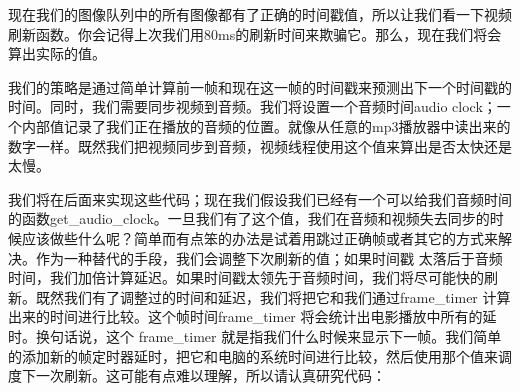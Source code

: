 现在我们的图像队列中的所有图像都有了正确的时间戳值，所以让我们看一下视频刷新函数。你会记得上次我们用80ms的刷新时间来欺骗它。那么，现在我们将会算出实际的值。

我们的策略是通过简单计算前一帧和现在这一帧的时间戳来预测出下一个时间戳的时间。同时，我们需要同步视频到音频。我们将设置一个音频时间audio clock；一个内部值记录了我们正在播放的音频的位置。就像从任意的mp3播放器中读出来的数字一样。既然我们把视频同步到音频，视频线程使用这个值来算出是否太快还是太慢。

我们将在后面来实现这些代码；现在我们假设我们已经有一个可以给我们音频时间的函数get_audio_clock。一旦我们有了这个值，我们在音频和视频失去同步的时候应该做些什么呢？简单而有点笨的办法是试着用跳过正确帧或者其它的方式来解决。作为一种替代的手段，我们会调整下次刷新的值；如果时间戳 太落后于音频时间，我们加倍计算延迟。如果时间戳太领先于音频时间，我们将尽可能快的刷新。既然我们有了调整过的时间和延迟，我们将把它和我们通过frame_timer 计算出来的时间进行比较。这个帧时间frame_timer 将会统计出电影播放中所有的延时。换句话说，这个 frame_timer 就是指我们什么时候来显示下一帧。我们简单的添加新的帧定时器延时，把它和电脑的系统时间进行比较，然后使用那个值来调度下一次刷新。这可能有点难以理解，所以请认真研究代码：

